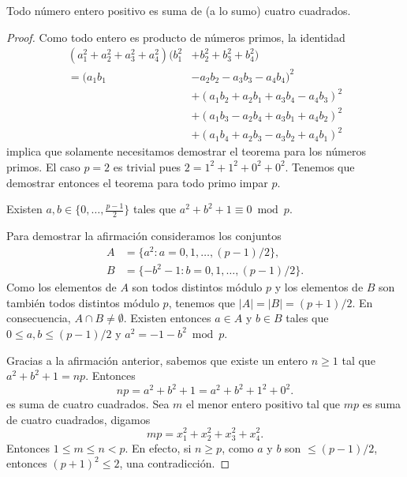 \begin{theorem}[Lagrange]
	\label{thm:Lagrange}
	Todo número entero positivo es suma de (a lo sumo) cuatro cuadrados.	
\end{theorem}

\begin{proof}
	Como todo entero es producto de números primos, 
	la identidad 
	\begin{equation}
		\begin{aligned}
			\label{eq:Euler}
			(a_1^2+a_2^2+a_3^2+a_4^2)(b_1^2&+b_2^2+b_3^2+b_4^2)\\
			=(a_1 b_1 &- a_2 b_2 - a_3 b_3 - a_4 b_4)^2\\
			&+(a_1 b_2 + a_2 b_1 + a_3 b_4 - a_4 b_3)^2\\
			&+(a_1 b_3 - a_2 b_4 + a_3 b_1 + a_4 b_2)^2\\
			&+(a_1 b_4 + a_2 b_3 - a_3 b_2 + a_4 b_1)^2
		\end{aligned}
	\end{equation}
	implica que solamente necesitamos demostrar el teorema para los números
	primos. El caso $p=2$ es trivial pues $2=1^2+1^2+0^2+0^2$. Tenemos que
	demostrar entonces el teorema para todo primo impar $p$. 

	\begin{claim}
		Existen $a,b\in\{0,\dots,\frac{p-1}{2}\}$ tales que
		$a^2+b^2+1\equiv0\bmod{p}$. 
	\end{claim}

	Para demostrar la afirmación consideramos los conjuntos 
	\begin{align*}
		A&=\{a^2:a=0,1,\dots,(p-1)/2\},\\
		B&=\{-b^2-1:b=0,1,\dots,(p-1)/2\}.
	\end{align*}
	Como los elementos de $A$ son todos distintos módulo $p$ y los elementos de
	$B$ son también todos distintos módulo $p$, tenemos que $|A|=|B|=(p+1)/2$.
	En consecuencia, $A\cap B\ne\emptyset$. Existen entonces $a\in A$ y $b\in B$
	tales que $0\leq a,b\leq (p-1)/2$ y $a^2=-1-b^2\bmod p$.

	\medskip
	Gracias a la afirmación anterior, sabemos que existe un entero $n\geq1$ tal
	que $a^2+b^2+1=np$. Entonces
	\[
		np=a^2+b^2+1=a^2+b^2+1^2+0^2.
	\]
	es suma de cuatro cuadrados. Sea $m$ el menor entero positivo tal que $mp$
	es suma de cuatro cuadrados, digamos
	\[
		mp=x_1^2+x_2^2+x_3^2+x_4^2.
	\]
	Entonces $1\leq m\leq n<p$. En efecto, si $n\geq p$, como $a$ y $b$ son
	$\leq(p-1)/2$, entonces $(p+1)^2\leq 2$, una contradicción. 


\end{proof}
